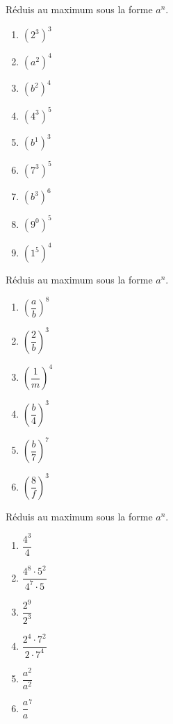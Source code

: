 \documentclass[12pt,parskip=half-, twoside=semi]{scrartcl}
\begin{document}
\begin{exercise}
  Réduis au maximum sous la forme $a^n$.
  \begin{enumerate}[cols=6]
    \item \(\left( 2^{3} \right)^{3} \)
    \item \(\left( a^{2} \right)^{4} \)
    \item \(\left( b^{2} \right)^{4} \)
    \item \(\left( 4^{3} \right)^{5} \)
    \item \(\left( b^{1} \right)^{3} \)
    \item \(\left( 7^{3} \right)^{5} \)
    \item \(\left( b^{3} \right)^{6} \)
    \item \(\left( 9^{0} \right)^{5} \)
    \item \(\left( 1^{5} \right)^{4} \)
  \end{enumerate}
\end{exercise}

\begin{exercise}
  Réduis au maximum sous la forme $a^n$.
  \begin{enumerate}[cols=6]
    \item \(\left( \dfrac{a}{b} \right)^{8} \)
    \item \(\left( \dfrac{2}{b} \right)^{3} \)
    \item \(\left( \dfrac{1}{m} \right)^{4} \)
    \item \(\left( \dfrac{b}{4} \right)^{3} \)
    \item \(\left( \dfrac{b}{7} \right)^{7} \)
    \item \(\left( \dfrac{8}{f} \right)^{3} \)
  \end{enumerate}
\end{exercise}

\begin{exercise}
  Réduis au maximum sous la forme $a^n$.
  \begin{enumerate}[cols=3]
    \item \(\dfrac{4^{3}}{4} \)
    \item \(\dfrac{4^{8} \cdot 5^{2}}{4^{7} \cdot 5}\)
    \item \(\dfrac{2^{9}}{2^{3}}\)
    \item \(\dfrac{2^{4} \cdot 7^{2}}{2 \cdot 7^{4}}\)
    \item \(\dfrac{a^{2}}{a^{2}}\)
    \item \(\dfrac{a}{a}^{7}\)
  \end{enumerate}
\end{exercise}
\end{document}
